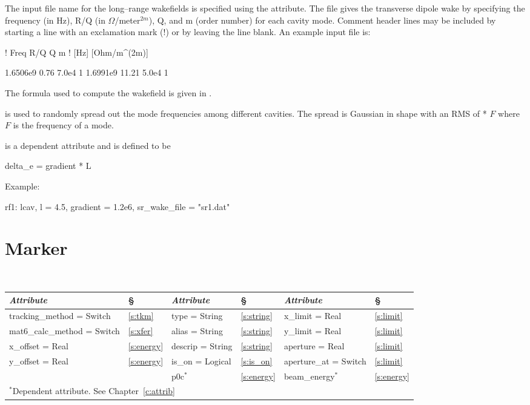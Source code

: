 {{The input file name for the long--range wakefields is specified using
the  attribute. The file gives the transverse dipole
wake by specifying the frequency (in Hz), R/Q (in
$\Omega$/meter$^{2m}$), Q, and m (order number) for each cavity mode.
Comment header lines may be included by starting a line with an
exclamation mark (!) or by leaving the line blank.  An example input
file is:
\begin{example}
  ! Freq       R/Q      Q       m
  ! [Hz]  [Ohm/m^(2m)]

  1.6506e9    0.76    7.0e4     1
  1.6991e9   11.21    5.0e4     1
\end{example}
The formula used to compute the wakefield is given in
. 

 is used to randomly spread out the mode frequencies
among different cavities. The spread is Gaussian in shape with an RMS
of  * $F$ where $F$ is the frequency of a mode.

 is a dependent attribute and is
defined to be
\begin{example}
  delta_e = gradient * L
\end{example}

Example:
\begin{example}
  rf1: lcav, l = 4.5, gradient = 1.2e6, sr\_wake\_file = "sr1.dat"
\end{example}

\section{Marker}
\label{s:mark}

\begin{center}
\tt
\begin{tabular}{|l|l||l|l||l|l|} \hline
  {\sl Attribute} & \S  & {\sl Attribute} & \S & {\sl Attribute} & \S \\ \hline
  tracking\_method = Switch    & \ref{s:tkm}    &  type = String    & \ref{s:string} & x\_limit = Real       & \ref{s:limit}  \\ \hline 
  mat6\_calc\_method = Switch  & \ref{s:xfer}   &  alias = String   & \ref{s:string} & y\_limit = Real       & \ref{s:limit}  \\ \hline 
  x\_offset = Real             & \ref{s:energy} &  descrip = String & \ref{s:string} & aperture = Real       & \ref{s:limit}  \\ \hline 
  y\_offset = Real             & \ref{s:energy} &  is\_on = Logical & \ref{s:is_on}  & aperture\_at = Switch & \ref{s:limit}  \\ \hline
                               &                & p0c$^*$           & \ref{s:energy} & beam\_energy$^*$      & \ref{s:energy} \\ \hline
  \multicolumn{6}{l}{\small $^*$Dependent attribute. See Chapter~\ref{c:attrib}} \\
\end{tabular}
\end{center}
\toffset

}}
